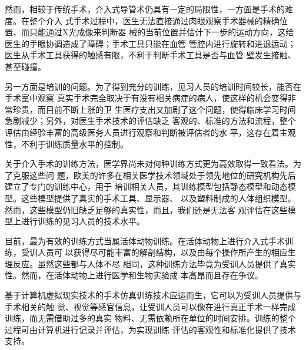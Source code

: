 然而，相较于传统手术，介入式导管术仍具有一定的局限性，一方面是手术的难度。在整个介入
式手术过程中，医生无法直接通过肉眼观察手术器械的精确位置、而只能通过X光成像来判断器
械的当前位置并估计下一步的运动方向，这给医生的手眼协调造成了障碍；手术工具只能在血管
管腔内进行旋转和进退运动；医生从手术工具获得的触感有限，不利于判断手术工具是否与血管
壁发生接触、甚至碰撞。

另一方面是培训的问题。为了得到充分的训练，见习人员的培训时间较长，能否在手术室中观察
真实手术完全取决于有没有相关病症的病人，使这样的机会变得非常珍贵，而目前不断上涨的卫
生医疗支出又加剧了这个问题，使得临床学习时间急剧减少；另外，对医生手术技术的评估缺乏
客观的、标准的方法和流程，整个评估由经验丰富的高级医务人员进行观察和判断被评估者的水
平，这存在着主观性，不利于训练质量水平的控制。

关于介入手术的训练方法，医学界尚未对何种训练方式更为高效取得一致看法。为了克服这些问
题，欧美的许多在相关医学技术领域处于领先地位的研究机构先后建立了专门的训练中心，用于
培训相关人员，其训练模型包括静态模型和动态模型。这些模型提供了真实的手术工具、显示器、
以及塑料制成的人体组织模型。然而，这些模型仍旧缺乏足够的真实性，而且，我们还是无法客
观评估在这些模型上进行训练的见习人员的技术水平。

目前，最为有效的训练方式当属活体动物训练。在活体动物上进行介入式手术训练，受训人员可
以获得尽可能丰富的解剖结构，以及由每个操作所产生的相应生理反应。虽然这些都与人体不尽
相同，这种训练方法毕竟为受训人员提供了真实性。然而，在活体动物上进行医学和生物实验成
本高昂而且存在争议。

基于计算机虚拟现实技术的手术仿真训练技术应运而生，它可以为受训人员提供与手术相关的触
觉、视觉等感官信息，让受训人员可以像在进行真正手术一样完成训练，而无需借助过多的真实
物料、无需依赖所在单位的时间安排。训练的整个过程可由计算机进行记录并评估，为实现训练
评估的客观性和标准化提供了技术支持。


